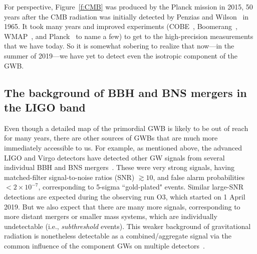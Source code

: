 For perspective, Figure~\ref{f:CMB} was produced by 
the Planck mission in 2015,
50 years after the CMB radiation was initially
detected by Penzias and Wilson~\cite{Penzias-Wilson:1965}
in 1965.
It took many years and improved experiments
(COBE~\cite{COBE:web}, Boomerang~\cite{boomerang:2002}, 
WMAP~\cite{WMAP:web}, and Planck~\cite{Planck:web} to name a few) 
to get to the high-precision measurements that we have today.
So it is somewhat sobering to realize that now---in the
summer of 2019---we have yet to detect even the isotropic 
component of the GWB.

\subsection{The background of BBH and BNS mergers in the 
LIGO band}
\label{s:BBH-BNS-LIGO}

Even though a detailed map of the primordial GWB is likely
to be out of reach for many years, there are other
sources of GWBs that are much more immediately accessible
to us.
For example, as mentioned above, the advanced LIGO
and Virgo detectors have detected other 
GW signals from several individual BBH 
and BNS mergers~\cite{TheLIGOScientific:2018-GWTC-1}.
These were very strong signals, having 
matched-filter signal-to-noise ratios (SNR) $\gtrsim 10$, 
and false alarm probabilities $<2\times 10^{-7}$,
corresponding to 5-sigma ``gold-plated" events.
Similar large-SNR detections are expected during the 
observing run O3, which started on 1 April 2019.
But we also expect that there are many more signals, 
corresponding to more distant mergers or smaller mass systems, 
which are 
individually undetectable (i.e., {\em subthreshold} events).
This weaker background of gravitational radiation is 
nonetheless detectable as a combined/aggregate signal
via the common influence of the component GWs on 
multiple detectors~\cite{TheLIGOScientific:2016-stochastic,
StochImplications:2018}.

